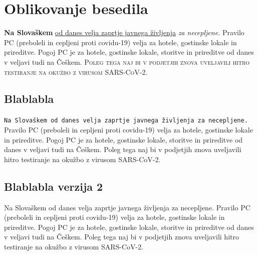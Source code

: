 \documentclass{article}
\begin{document}
\section{Oblikovanje besedila}
\textbf{Na Slovaškem} \underline{od danes velja zaprtje javnega življenja} \textit{za necepljene.} Pravilo PC (preboleli in cepljeni proti covidu-19) velja za hotele, gostinske lokale in prireditve. Pogoj PC je za hotele, gostinske lokale, storitve in prireditve od danes v veljavi tudi na Češkem. \textsc{Poleg tega naj bi v podjetjih znova uveljavili hitro testiranje na okužbo z virusom SARS-CoV-2.}
\subsection{Blablabla}
\texttt{Na Slovaškem od danes velja zaprtje javnega življenja za necepljene.} \textsf{Pravilo PC (preboleli in cepljeni proti covidu-19)} velja za hotele, gostinske lokale in prireditve. Pogoj PC je za hotele, gostinske lokale, storitve in prireditve od danes v veljavi tudi na Češkem. Poleg tega naj bi v podjetjih znova uveljavili hitro testiranje na okužbo z virusom SARS-CoV-2.
\subsection{Blablabla verzija 2}
Na Slovaškem od danes velja zaprtje javnega življenja za necepljene. Pravilo PC (preboleli in cepljeni proti covidu-19) velja za hotele, gostinske lokale in prireditve. Pogoj PC je za hotele, gostinske lokale, storitve in prireditve od danes v veljavi tudi na Češkem. Poleg tega naj bi v podjetjih znova uveljavili hitro testiranje na okužbo z virusom SARS-CoV-2.
\end{document}
